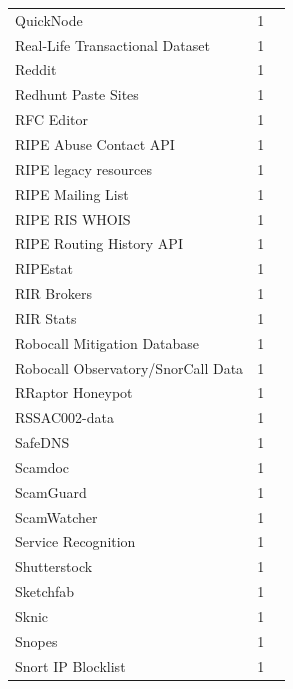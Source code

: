 \documentclass[11pt,a4paper]{article}
\begin{document}
\begin{longtable}{@{}p{} p{}p{}@{}}
QuickNode & 1 & \cite{10.1145/3777912.3839782} \\
Real-Life Transactional Dataset & 1 & \cite{10.1145/3730567.3764487} \\
Reddit & 1 & \cite{10.1007/978-3-030-72582-2_7} \\
Redhunt Paste Sites & 1 & \cite{10.1145/3777912.3809151} \\
RFC Editor & 1 & \cite{10.1145/3487552.3487821} \\
RIPE Abuse Contact API & 1 & \cite{10.1145/3777912.3809155} \\
RIPE legacy resources & 1 & \cite{10.1145/3487552.3487838} \\
RIPE Mailing List & 1 & \cite{10.1007/978-3-032-18268-5_5} \\
RIPE RIS WHOIS & 1 & \cite{10.1145/3777912.3839812} \\
RIPE Routing History API & 1 & \cite{10.1145/3517745.3561421} \\
RIPEstat & 1 & \cite{10.1007/978-3-032-18268-5_9} \\
RIR Brokers & 1 & \cite{10.1145/3646547.3689010} \\
RIR Stats  & 1 & \cite{10.1145/3517745.3561454} \\
Robocall Mitigation Database & 1 & \cite{10.1145/3777912.3839819} \\
Robocall Observatory/SnorCall Data & 1 & \cite{10.1145/3777912.3839819} \\
RRaptor Honeypot & 1 & \cite{10.1145/3777912.3839819} \\
RSSAC002-data & 1 & \cite{10.1007/978-3-030-98785-5_12} \\
SafeDNS & 1 & \cite{10.1145/3777912.3839806} \\
Scamdoc & 1 & \cite{10.1145/3777912.3839792} \\
ScamGuard & 1 & \cite{10.1145/3777912.3839793} \\
ScamWatcher & 1 & \cite{10.1145/3618257.3624822} \\
Service Recognition & 1 & \cite{10.1145/3777912.3839833} \\
Shutterstock & 1 & \cite{10.1145/3517745.3561450} \\
Sketchfab & 1 & \cite{10.1145/3618257.3624833} \\
Sknic & 1 & \cite{10.1007/978-3-031-85960-1_5} \\
Snopes & 1 & \cite{10.1145/3487552.3487850} \\
Snort IP Blocklist & 1 & \cite{10.1007/978-3-030-72582-2_31} \\

\end{longtable}
\end{document}
